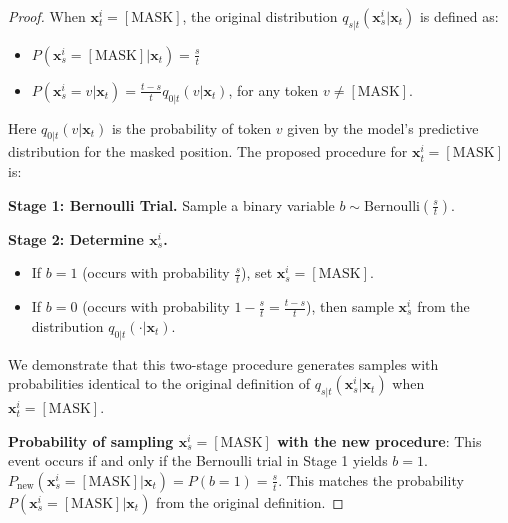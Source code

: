 \begin{proof}
When $\boldsymbol{x}_t^i = [\text{MASK}]$, the original distribution $q_{s|t}(\boldsymbol{x}_s^i|\boldsymbol{x}_t)$ is defined as:
\begin{itemize}
    \item $P(\boldsymbol{x}_s^i = [\text{MASK}] | \boldsymbol{x}_t) = \frac{s}{t}$
    \item $P(\boldsymbol{x}_s^i = v | \boldsymbol{x}_t) = \frac{t-s}{t} q_{0|t}(v | \boldsymbol{x}_t)$, for any token $v \neq [\text{MASK}]$.
\end{itemize}
Here $q_{0|t}(v | \boldsymbol{x}_t)$ is the probability of token $v$ given by the model's predictive distribution for the masked position. The proposed procedure for $\boldsymbol{x}_t^i = [\text{MASK}]$ is:

\textbf{Stage 1: Bernoulli Trial.} Sample a binary variable $b \sim \text{Bernoulli}\left(\frac{s}{t}\right)$.

\textbf{Stage 2: Determine $\boldsymbol{x}_s^i$.}
\begin{itemize}
    \item If $b=1$ (occurs with probability $\frac{s}{t}$), set $\boldsymbol{x}_s^i = [\text{MASK}]$.
    \item If $b=0$ (occurs with probability $1 - \frac{s}{t} = \frac{t-s}{t}$), then sample $\boldsymbol{x}_s^i$ from the distribution $q_{0|t}(\cdot | \boldsymbol{x}_t)$.
\end{itemize}
We demonstrate that this two-stage procedure generates samples with probabilities identical to the original definition of $q_{s|t}(\boldsymbol{x}_s^i|\boldsymbol{x}_t)$ when $\boldsymbol{x}_t^i = [\text{MASK}]$.

\textbf{Probability of sampling $\boldsymbol{x}_s^i = [\text{MASK}]$ with the new procedure}:
This event occurs if and only if the Bernoulli trial in Stage 1 yields $b=1$. $P_{\text{new}}(\boldsymbol{x}_s^i = [\text{MASK}] | \boldsymbol{x}_t) = P(b=1) = \frac{s}{t}$. This matches the probability $P(\boldsymbol{x}_s^i = [\text{MASK}] | \boldsymbol{x}_t)$ from the original definition.



\end{proof}
